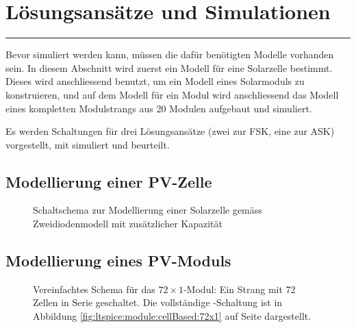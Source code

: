 \chapter{L\"osungsans\"atze und Simulationen}
\label{chap:simu}

{%
    \small
    \startcontents[chapters]
}

\plainbreak{1}

Bevor  simuliert  werden  kann,  m\"ussen  die  daf\"ur  ben\"otigten  Modelle
vorhanden  sein. In  diesem  Abschnitt  wird  zuerst  ein  Modell  f\"ur  eine
Solarzelle bestimmt. Dieses  wird anschliessend  benutzt, um ein  Modell eines
Solarmoduls  zu  konstruieren,  und  auf  dem  Modell  f\"ur  ein  Modul  wird
anschliessend  das  Modell  eines   kompletten  Modulstrangs  aus  20  Modulen
aufgebaut und simuliert.

Es werden  Schaltungen f\"ur drei  L\"osungsans\"atze (zwei zur FSK,  eine zur
ASK) vorgestellt, mit  simuliert und beurteilt.


\section{Modellierung einer PV-Zelle}
\label{sec:simu:model:cell}


\begin{figure}[h!tb]
    \centering
    
    \caption{%
        Schaltschema    zur    Modellierung    einer    Solarzelle    gem\"ass
        Zweidiodenmodell mit zus\"atzlicher Kapazit\"at%
    }
    \label{fig:circuit:solarCell}
\end{figure}


\clearpage
\section{Modellierung eines PV-Moduls}
\label{sec:simu:model:module}


\begin{figure}[h!tb]
    \centering
    
    \caption{%
        Vereinfachtes      Schema      f\"ur      das      $72      \times
        1$-Modul: Ein     Strang    mit     72     Zellen     in     Serie
        geschaltet. Die  vollst\"andige  -Schaltung  ist  in
        Abbildung   \ref{fig:ltspice:module:cellBased:72x1}    auf   Seite
        \pageref{fig:ltspice:module:cellBased:72x1} dargestellt.%
    }
    \label{fig:circuit:72x1:simplified}
\end{figure}


